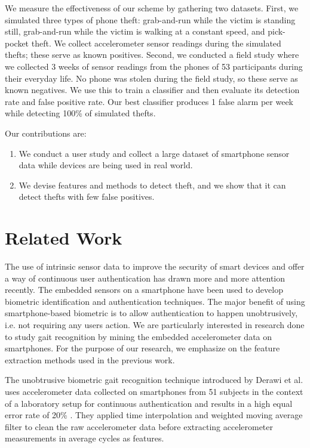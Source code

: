 \documentclass{soups}
\begin{document}
We measure the effectiveness of our scheme by gathering two datasets.
First, we simulated three types of phone theft: grab-and-run while the victim is standing still, grab-and-run while the victim is walking at a constant speed, and pick-pocket theft.
We collect accelerometer sensor readings during the simulated thefts; these serve as known positives.
Second, we conducted a field study where we collected 3 weeks of sensor readings from the phones of 53 participants during their everyday life.
No phone was stolen during the field study, so these serve as known negatives.
We use this to train a classifier and then evaluate its detection rate and false positive rate.
Our best classifier produces 1 false alarm per week while detecting 100\% of simulated thefts.

Our contributions are:
\begin{enumerate}
  \item We conduct a user study and collect a large dataset of smartphone sensor data while devices are being used in real world.
  \item We devise features and methods to detect theft, and we show that it can detect thefts with few false positives.
\end{enumerate}




\section{Related Work}

The use of intrinsic sensor data to improve the security of smart devices and offer a way of continuous user authentication has drawn more and more attention recently. The embedded sensors on a smartphone have been used to develop biometric identification and authentication techniques. The major benefit of using smartphone-based biometric is to allow authentication to happen unobtrusively, i.e. not requiring any users action. We are particularly interested in research done to study gait recognition by mining the embedded accelerometer data on smartphones. For the purpose of our research, we emphasize on the feature extraction methods used in the previous work.

The unobtrusive biometric gait recognition technique introduced by Derawi et al. uses accelerometer data collected on smartphones from 51 subjects in the context of a laboratory setup for continuous authentication and results in a high equal error rate of 20\% \cite{derawi:gait}. They applied time interpolation and weighted moving average filter to clean the raw accelerometer data before extracting accelerometer measurements in average cycles as features.
\end{document}
